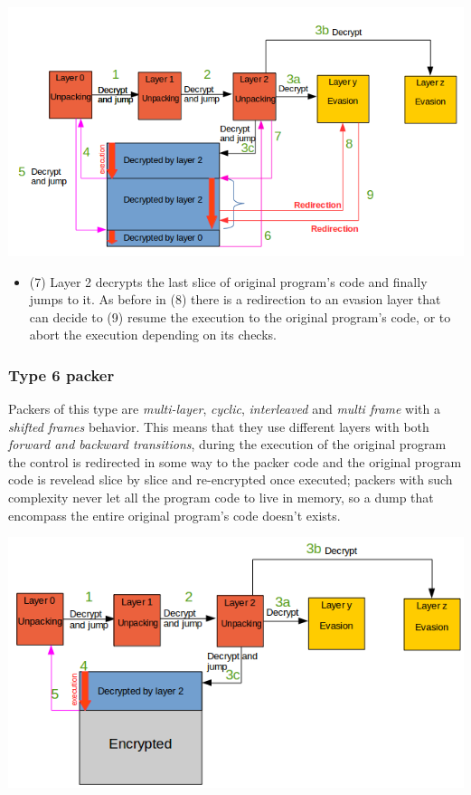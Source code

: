 \includegraphics[width=1.1\textwidth]{pictures/packer_type_5-3.png}

\begin{itemize}
\item (7) Layer 2 decrypts the last slice of original program's code and finally jumps to it. As before in (8) there is a redirection to an evasion layer that can decide to (9) resume the execution to the original program's code, or to abort the execution depending on its checks.
\end{itemize}

\subsubsection{Type 6 packer}

Packers of this type are \textit{multi-layer}, \textit{cyclic}, \textit{interleaved} and \textit{multi frame} with a \textit{shifted frames} behavior. This means that they use different layers with both \textit{forward and backward transitions}, during the execution of the original program the control is redirected in some way to the packer code and the original program code is revelead slice by slice and re-encrypted once executed; packers with such complexity never let all the program code to live in memory, so a dump that encompass the entire original program's code doesn't exists.

\includegraphics[width=1\textwidth]{pictures/packer_type_5-1.png}

